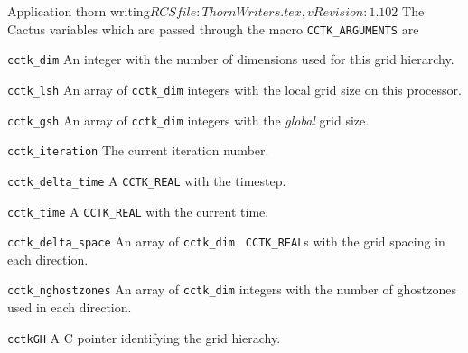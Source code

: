 \begin{cactuspart}{2}{Application thorn writing}{$RCSfile: ThornWriters.tex,v $}{$Revision: 1.102 $}
The Cactus variables which are passed through the macro
{\tt CCTK\_ARGUMENTS} are
\begin{Lentry}
\item [{\tt cctk\_dim}] An integer with the number of dimensions
      used for this grid hierarchy.
\item [{\tt cctk\_lsh}] An array of {\tt cctk\_dim} integers
      with the local grid size on this processor.
\item [{\tt cctk\_gsh}] An array of {\tt cctk\_dim} integers
      with the {\it global} grid size.
\item [\texttt{cctk\_iteration}] The current iteration number.
\item [{\tt cctk\_delta\_time}] A {\tt CCTK\_REAL} with the timestep.
\item [{\tt cctk\_time}] A {\tt CCTK\_REAL} with the current time.
\item [{\tt cctk\_delta\_space}] An array of {\tt cctk\_dim} {\tt
CCTK\_REAL}s with the grid spacing in each direction.
\item [{\tt cctk\_nghostzones}] An array of {\tt cctk\_dim} integers with
         the number of ghostzones used in each direction.
\item [{\tt cctkGH}] A C pointer identifying the grid hierachy.
\end{Lentry}


\end{cactuspart}
